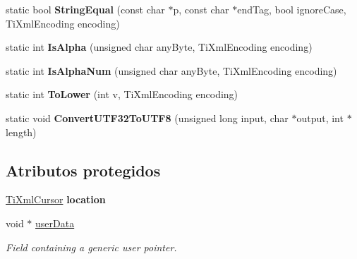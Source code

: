 \begin{DoxyCompactItemize}
\item 
\hypertarget{classTiXmlBase_a51631e6986179558b9e5850723ed165a}{static bool {\bfseries \-String\-Equal} (const char $\ast$p, const char $\ast$end\-Tag, bool ignore\-Case, \-Ti\-Xml\-Encoding encoding)}\label{classTiXmlBase_a51631e6986179558b9e5850723ed165a}

\item 
\hypertarget{classTiXmlBase_ae22522b2e8e1ac43102d16394f639fc8}{static int {\bfseries \-Is\-Alpha} (unsigned char any\-Byte, \-Ti\-Xml\-Encoding encoding)}\label{classTiXmlBase_ae22522b2e8e1ac43102d16394f639fc8}

\item 
\hypertarget{classTiXmlBase_a321919055c115c78ded17f85a793f368}{static int {\bfseries \-Is\-Alpha\-Num} (unsigned char any\-Byte, \-Ti\-Xml\-Encoding encoding)}\label{classTiXmlBase_a321919055c115c78ded17f85a793f368}

\item 
\hypertarget{classTiXmlBase_a799f17405a86a5c2029618e85f11a097}{static int {\bfseries \-To\-Lower} (int v, \-Ti\-Xml\-Encoding encoding)}\label{classTiXmlBase_a799f17405a86a5c2029618e85f11a097}

\item 
\hypertarget{classTiXmlBase_a07c765e3a7f979d343e646ea797b180b}{static void {\bfseries \-Convert\-U\-T\-F32\-To\-U\-T\-F8} (unsigned long input, char $\ast$output, int $\ast$length)}\label{classTiXmlBase_a07c765e3a7f979d343e646ea797b180b}

\end{DoxyCompactItemize}
\subsection*{\-Atributos protegidos}
\begin{DoxyCompactItemize}
\item 
\hypertarget{classTiXmlBase_a0d992580f3bc264909f898e942677a3c}{\hyperlink{structTiXmlCursor}{\-Ti\-Xml\-Cursor} {\bfseries location}}\label{classTiXmlBase_a0d992580f3bc264909f898e942677a3c}

\item 
\hypertarget{classTiXmlBase_ab242c01590191f644569fa89a080d97c}{void $\ast$ \hyperlink{classTiXmlBase_ab242c01590191f644569fa89a080d97c}{user\-Data}}\label{classTiXmlBase_ab242c01590191f644569fa89a080d97c}

\begin{DoxyCompactList}\small\item\em \-Field containing a generic user pointer. \end{DoxyCompactList}\end{DoxyCompactItemize}
